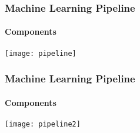 \begin{frame}
    \frametitle{Machine Learning Pipeline}
    \framesubtitle{Components}
    \centering

    \texttt{[image: pipeline]}
\end{frame}


\begin{frame}
    \frametitle{Machine Learning Pipeline}
    \framesubtitle{Components}
    \centering

    \texttt{[image: pipeline2]}
\end{frame}
